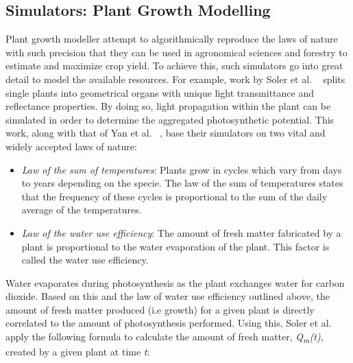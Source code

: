 \subsection{Simulators: Plant Growth Modelling} \label{subsec:simulators_plant_growth_modelers}

Plant growth modeller attempt to algorithmically reproduce the laws of nature with such precision that they can be used in agronomical sciences and forestry to estimate and maximize crop yield. To achieve this, such simulators go into great detail to model the available resources. For example,  work by Soler et al. ~\cite{Soler2001,Soler2003} splits single plants into geometrical organs with unique light transmittance and reflectance properties. By doing so, light propagation within the plant can be simulated in order to determine the aggregated photosynthetic potential. This work, along with that of Yan et al. ~\cite{Yan2004}, base their simulators on two vital and widely accepted laws of nature:
\begin{itemize}
\item \textit{Law of the sum of temperatures}: Plants grow in cycles which vary from days to years depending on the specie. The law of the sum of temperatures states that the frequency of these cycles is proportional to the sum of the daily average of the temperatures.
\item \textit{Law of the water use efficiency}: The amount of fresh matter fabricated by a plant is proportional to the water evaporation of the plant. This factor is called the water use efficiency. 
\end{itemize}

Water evaporates during photosynthesis as the plant exchanges water for carbon dioxide. Based on this and the law of water use efficiency outlined above, the amount of fresh matter produced (i.e growth) for a given plant is directly correlated to the amount of photosynthesis performed. Using this, Soler et al. ~\cite{Soler2001} apply the following formula to calculate the amount of fresh matter, \textit{Q\textsubscript{m}(t)}, created by a given plant at time \textit{t}:\\

